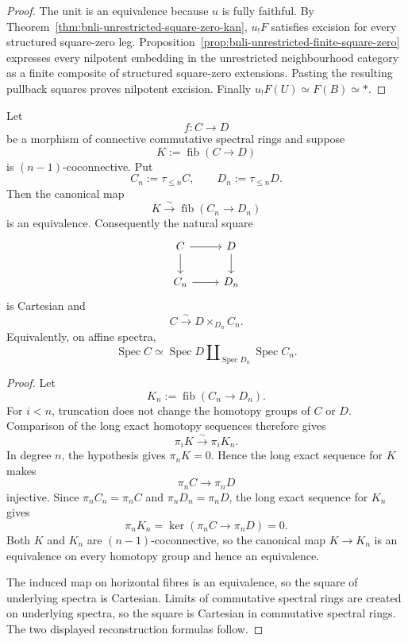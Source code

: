 \begin{proof}
The unit is an equivalence because $u$ is fully faithful.  By
Theorem~\ref{thm:bnli-unrestricted-square-zero-kan}, $u_!F$ satisfies
excision for every structured square-zero leg.  Proposition~\ref{prop:bnli-unrestricted-finite-square-zero}
expresses every nilpotent embedding in the unrestricted neighbourhood category
as a finite composite of structured square-zero extensions.  Pasting the
resulting pullback squares proves nilpotent excision.  Finally
$u_!F(U)\simeq F(B)\simeq *$.
\end{proof}


\begin{lemma}
\label{lem:bnli-relative-postnikov-reconstruction}
Let
\[
    f:C\longrightarrow D
\]
be a morphism of connective commutative spectral rings and suppose
\[
    K:=\operatorname{fib}(C\to D)
\]
is $(n-1)$-coconnective.  Put
\[
    C_n:=\tau_{\leq n}C,
    \qquad
    D_n:=\tau_{\leq n}D.
\]
Then the canonical map
\[
\boxed{
    K
    \xrightarrow{\sim}
    \operatorname{fib}(C_n\to D_n)}
\]
is an equivalence.  Consequently the natural square
\[
\begin{tikzcd}
C \arrow[r] \arrow[d] & D \arrow[d]\\
C_n \arrow[r] & D_n
\end{tikzcd}
\]
is Cartesian and
\[
\boxed{
    C
    \xrightarrow{\sim}
    D\times_{D_n}C_n.}
\]
Equivalently, on affine spectra,
\[
\boxed{
    \operatorname{Spec}C
    \simeq
    \operatorname{Spec}D
    \amalg_{\operatorname{Spec}D_n}
    \operatorname{Spec}C_n.}
\]
\end{lemma}

\begin{proof}
Let
\[
    K_n:=\operatorname{fib}(C_n\to D_n).
\]
For $i<n$, truncation does not change the homotopy groups of $C$ or $D$.
Comparison of the long exact homotopy sequences therefore gives
\[
    \pi_iK\xrightarrow{\sim}\pi_iK_n.
\]
In degree $n$, the hypothesis gives $\pi_nK=0$.  Hence the long exact
sequence for $K$ makes
\[
    \pi_nC\longrightarrow\pi_nD
\]
injective.  Since $\pi_nC_n=\pi_nC$ and $\pi_nD_n=\pi_nD$, the long exact
sequence for $K_n$ gives
\[
    \pi_nK_n
    =
    \ker(\pi_nC\to\pi_nD)
    =0.
\]
Both $K$ and $K_n$ are $(n-1)$-coconnective, so the canonical map
$K\to K_n$ is an equivalence on every homotopy group and hence an
equivalence.

The induced map on horizontal fibres is an equivalence, so the square of
underlying spectra is Cartesian.  Limits of commutative spectral rings are
created on underlying spectra, so the square is Cartesian in commutative
spectral rings.  The two displayed reconstruction formulas follow.
\end{proof}

